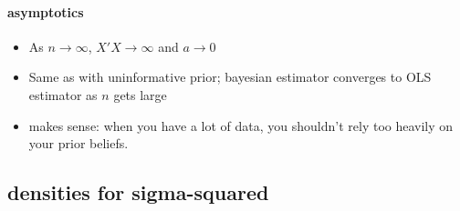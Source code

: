 \paragraph{asymptotics}
\begin{itemize}
\item As $n → ∞$, $X'X → ∞$ and $a → 0$
\item Same as with uninformative prior; bayesian estimator
         converges to OLS estimator as $n$ gets large
\item makes sense: when you have a lot of data, you shouldn't rely
         too heavily on your prior beliefs.
\end{itemize}

\subsection{densities for sigma-squared}

